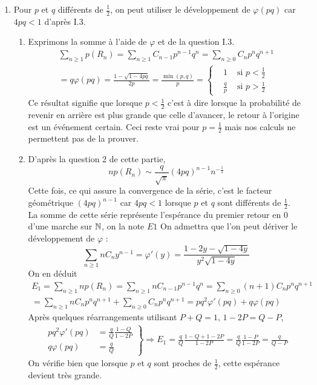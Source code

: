 \begin{enumerate}
\item Pour $p$ et $q$ différents de $\frac{1}{2}$, on peut utiliser le développement de $\varphi(pq)$ car $4pq<1$ d'après I.3.
\begin{enumerate}
  \item Exprimons la somme à l'aide de $\varphi$ et de la question I.3.
\begin{multline*}
\sum_{n\geq 1}p(R_n)
= \sum_{n\geq 1}C_{n-1}p^{n-1}q^n= \sum_{n\geq 0}C_{n}p^{n}q^{n+1} \\
= q\varphi(pq)
= \frac{1-\sqrt{1-4pq}}{2p}
= \frac{\min(p,q)}{p}
=
\left\lbrace 
\begin{aligned}
  &1 &\text{ si }p<\frac{1}{2}\\
  &\frac{q}{p} &\text{ si }p>\frac{1}{2}
\end{aligned}
\right. 
\end{multline*}
Ce résultat signifie que lorsque $p<\frac{1}{2}$ c'est à dire lorsque la probabilité de revenir en arrière est plus grande que celle d'avancer, le retour à l'origine est un événement certain. Ceci reste vrai pour $p=\frac{1}{2}$ mais nos calculs ne permettent pas de la prouver.

  \item D'après la question 2 de cette partie,
\begin{displaymath}
  np(R_n) \sim \frac{q}{\sqrt{\pi}}(4pq)^{n-1}n^{-\frac{1}{2}}
\end{displaymath}
Cette fois, ce qui assure la convergence de la série, c'est le facteur géométrique $(4pq)^{n-1}$ car $4pq<1$ lorsque $p$ et $q$ sont différents de $\frac{1}{2}$.\\
La somme de cette série représente l'espérance du premier retour en $0$ d'une marche sur $\mathbb{N}$, on la note $E1$\newline
On admettra que l'on peut dériver le développement de $\varphi$ :
\begin{displaymath}
  \sum_{n\geq 1}nC_ny^{n-1} = \varphi'(y) 
  =\frac{1-2y-\sqrt{1-4y}}{y^2\sqrt{1-4y}}
\end{displaymath}
On en déduit
\begin{multline*}
E_1 = \sum_{n\geq 1}np(R_n) =  \sum_{n\geq 1}nC_{n-1}p^{n-1}q^n 
=\sum_{n\geq 0}(n+1)C_{n}p^{n}q^{n+1}\\
=\sum_{n\geq 1}nC_{n}p^{n}q^{n+1} + \sum_{n\geq 0}C_{n}p^{n}q^{n+1} 
= pq^2 \varphi'(pq) + q\varphi(pq)
\end{multline*}
Après quelques réarrangements utilisant $P+Q=1$, $1-2P=Q-P$,
\begin{multline*}
\left. 
\begin{aligned}
pq^2\varphi'(pq) &= \frac{q}{Q} \frac{1-Q}{1-2P}\\
q\varphi(pq) &= \frac{q}{Q}
\end{aligned}
\right\rbrace 
\Rightarrow 
E_1 = \frac{q}{Q}\frac{1-Q + 1-2P}{1-2P} 
= \frac{q}{Q}\frac{1-P}{1-2P}
= \frac{q}{Q-P}
\end{multline*}
On vérifie bien que lorsque $p$ et $q$ sont proches de $\frac{1}{2}$, cette espérance devient très grande.

\end{enumerate}
\end{enumerate}

